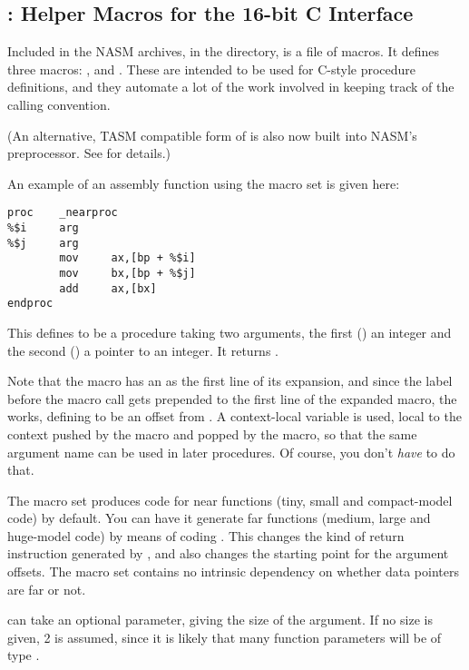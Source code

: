 \subsection{: Helper Macros for the 16-bit C Interface}
\label{subsec:16cmacro}

Included in the NASM archives, in the 
directory, is a file  of macros. It defines three macros:
,  and . These are intended
to be used for C-style procedure definitions, and they automate a lot of
the work involved in keeping track of the calling convention.

(An alternative, TASM compatible form of  is also now built
into NASM's preprocessor. See  for details.)

An example of an assembly function using the macro set is given
here:

\begin{lstlisting}
proc    _nearproc
%$i     arg
%$j     arg
        mov     ax,[bp + %$i]
        mov     bx,[bp + %$j]
        add     ax,[bx]
endproc
\end{lstlisting}

This defines  to be a procedure taking two arguments,
the first () an integer and the second () a pointer to an
integer. It returns .

Note that the  macro has an  as the first line of its
expansion, and since the label before the macro call gets prepended
to the first line of the expanded macro, the  works, defining
 to be an offset from . A context-local variable is
used, local to the context pushed by the  macro and popped
by the  macro, so that the same argument name can be used
in later procedures. Of course, you don't \emph{have} to do that.

The macro set produces code for near functions (tiny, small and
compact-model code) by default. You can have it generate far
functions (medium, large and huge-model code) by means of coding
. This changes the kind of
return instruction generated by , and also changes the
starting point for the argument offsets. The macro set contains no
intrinsic dependency on whether data pointers are far or not.

 can take an optional parameter, giving the size of the
argument. If no size is given, 2 is assumed, since it is likely that
many function parameters will be of type .

